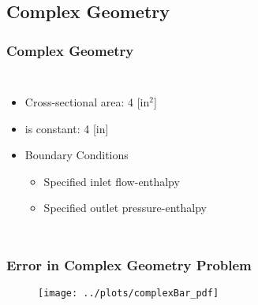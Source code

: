 \documentclass[compress,xcolor=table]{beamer}
\newlength{\hpw}
\begin{document}
\subsection[Complex Geometry]{Complex Geometry}
\begin{frame}
\frametitle{Complex Geometry}
\begin{columns}
\column{\hpw}

\begin{itemize}
\item{Cross-sectional area: 4 [in$^2$]}
\item{\dx{} is constant: 4 [in]}
\item{ Boundary Conditions
	\begin{itemize}
	\item{Specified inlet flow-enthalpy}
	\item{Specified outlet pressure-enthalpy}
\end{itemize}
}
\end{itemize}

\column{\hpw}

\begin{figure}[h!t]
\centering
\resizebox{\textwidth}{!}{

}
\end{figure}

\end{columns}
\end{frame}
\begin{frame}
\frametitle{Error in Complex Geometry Problem}

\begin{figure}[h!t]
\centering
\texttt{[image: ../plots/complexBar\_pdf]}
\end{figure}

\end{frame}
\end{document}
